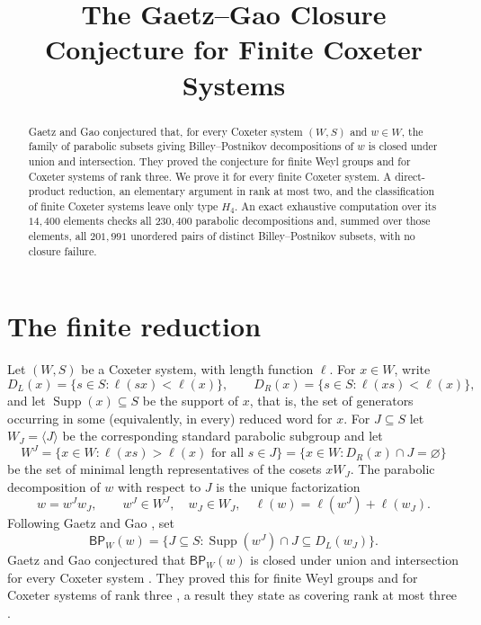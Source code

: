\documentclass[11pt]{amsart}
\title[The Gaetz--Gao closure conjecture]{The Gaetz--Gao Closure Conjecture for Finite Coxeter Systems}
\date{}
\DeclareMathOperator{\Supp}{Supp}
\newcommand{\BP}{\mathsf{BP}}
\newcommand{\DL}{D_L}
\newcommand{\DR}{D_R}
\begin{document}
\begin{abstract}
Gaetz and Gao conjectured that, for every Coxeter system $(W,S)$ and
$w\in W$, the family of parabolic subsets giving Billey--Postnikov
decompositions of $w$ is closed under union and intersection. They proved
the conjecture for finite Weyl groups and for Coxeter systems of rank
three. We prove it for every finite Coxeter system. A direct-product
reduction, an elementary argument in rank at most two, and the
classification of finite Coxeter systems leave only type
$H_4$. An exact exhaustive computation over its $14{,}400$ elements checks
all $230{,}400$ parabolic decompositions and, summed over those elements, all
$201{,}991$ unordered pairs of distinct Billey--Postnikov subsets, with no
closure failure.
\end{abstract}

\maketitle

\section{The finite reduction}

Let $(W,S)$ be a Coxeter system, with length function $\ell$. For
$x\in W$, write
\[
  \DL(x)=\{s\in S:\ell(sx)<\ell(x)\},
  \qquad
  \DR(x)=\{s\in S:\ell(xs)<\ell(x)\},
\]
and let $\Supp(x)\subseteq S$ be the support of $x$, that is, the set of
generators occurring in some (equivalently, in every) reduced word for $x$.
For $J\subseteq S$ let $W_J=\langle J\rangle$ be the corresponding standard
parabolic subgroup and let
\[
  W^J=\{x\in W:\ell(xs)>\ell(x)\text{ for all }s\in J\}
     =\{x\in W:\DR(x)\cap J=\varnothing\}
\]
be the set of minimal length representatives of the cosets $xW_J$. The
parabolic decomposition of $w$ with respect to $J$ is the unique
factorization
\[
  w=w^Jw_J,
  \qquad
  w^J\in W^J,
  \quad
  w_J\in W_J,
  \quad
  \ell(w)=\ell(w^J)+\ell(w_J).
\]
Following Gaetz and Gao \cite[Definition~2.1]{GaetzGao}, set
\[
  \BP_W(w)
  =
  \bigl\{
    J\subseteq S:
    \Supp(w^J)\cap J\subseteq \DL(w_J)
  \bigr\}.
\]
Gaetz and Gao conjectured that $\BP_W(w)$ is closed under union and
intersection for every Coxeter system \cite[Conjecture~1.3]{GaetzGao}.
They proved this for finite Weyl groups \cite[Theorem~1.2]{GaetzGao} and for
Coxeter systems of rank three \cite[Theorem~3.15]{GaetzGao}, a result they
state as covering rank at most three \cite[Section~1]{GaetzGao}.
\end{document}
